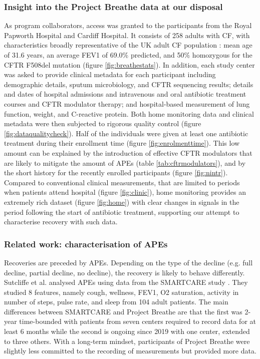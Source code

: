 \subsubsection{Insight into the Project Breathe data at our disposal}
As program collaborators, access was granted to the participants from the Royal Papworth Hospital and Cardiff Hospital. It consists of 258 adults with CF, with characteristics broadly representative of the UK adult CF population \cite{uk_resigtry_2019}: mean age of 31.6 years, an average FEV1 of 69.0\% predicted, and 50\% homozygous for the CFTR F508del mutation (figure \ref{fig:breathestats}).
In addition, each study center was asked to provide clinical metadata for each participant including demographic details, sputum microbiology, and CFTR sequencing results; details and dates of hospital admissions and intravenous and oral antibiotic treatment courses and CFTR modulator therapy; and hospital-based measurement of lung function, weight, and C-reactive protein. Both home monitoring data and clinical metadata were then subjected to rigorous quality control (figure \ref{fig:dataqualitycheck}). Half of the individuals were given at least one antibiotic treatment during their enrollment time (figure \ref{fig:enrolmenttime}). This low amount can be explained by the introduction of effective CFTR modulators that are likely to mitigate the amount of APEs (table \ref{tab:cftrmodulators}), and by the short history for the recently enrolled participants (figure \ref{fig:nintr}). Compared to conventional clinical measurements, that are limited to periods when patients attend hospital (figure \ref{fig:clinic}), home monitoring provides an extremely rich dataset (figure \ref{fig:home}) with clear changes in signals in the period following the start of antibiotic treatment, supporting our attempt to characterise recovery with such data.

\subsubsection{Related work: characterisation of APEs}
Recoveries are preceded by APEs. Depending on the type of the decline (e.g. full decline, partial decline, no decline), the recovery is likely to behave differently. Sutcliffe et al. analysed APEs using data from the SMARTCARE study \cite{damian}. They studied 8 features, namely cough, wellness, FEV1, O2 saturation, activity in number of steps, pulse rate, and sleep from 104 adult patients. The main differences between SMARTCARE and Project Breathe are that the first was 2-year time-bounded with patients from seven centers required to record data for at least 6 months while the second is ongoing since 2019 with one center, extended to three others. With a long-term mindset, participants of Project Breathe were slightly less committed to the recording of measurements but provided more data.

